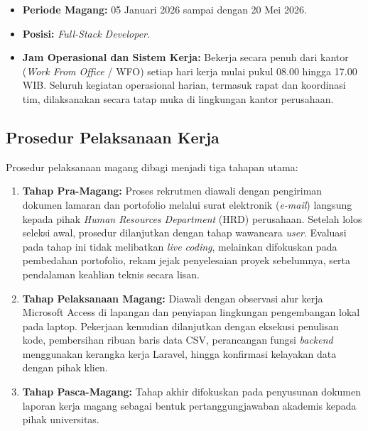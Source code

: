 \begin{itemize}
    \item \textbf{Periode Magang:} 05 Januari 2026 sampai dengan 20 Mei 2026.
    \item \textbf{Posisi:} \textit{Full-Stack Developer}.
    \item \textbf{Jam Operasional dan Sistem Kerja:} Bekerja secara penuh dari
    kantor (\textit{Work From Office} / WFO) setiap hari kerja mulai pukul
    08.00 hingga 17.00 WIB. Seluruh kegiatan operasional harian, termasuk
    rapat dan koordinasi tim, dilaksanakan secara tatap muka di lingkungan
    kantor perusahaan.
\end{itemize}
 
\subsection{Prosedur Pelaksanaan Kerja}
 
\medskip
 
Prosedur pelaksanaan magang dibagi menjadi tiga tahapan utama:
 
\vspace{0.5em}
 
\begin{enumerate}
    \item \textbf{Tahap Pra-Magang:} Proses rekrutmen diawali dengan pengiriman
    dokumen lamaran dan portofolio melalui surat elektronik (\textit{e-mail})
    langsung kepada pihak \textit{Human Resources Department} (HRD)
    perusahaan. Setelah lolos seleksi awal, prosedur dilanjutkan dengan tahap
    wawancara \textit{user}. Evaluasi pada tahap ini tidak melibatkan
    \textit{live coding}, melainkan difokuskan pada pembedahan portofolio,
    rekam jejak penyelesaian proyek sebelumnya, serta pendalaman keahlian
    teknis secara lisan.
    \item \textbf{Tahap Pelaksanaan Magang:} Diawali dengan observasi alur kerja
    Microsoft Access di lapangan dan penyiapan lingkungan pengembangan lokal
    pada laptop. Pekerjaan kemudian dilanjutkan dengan eksekusi penulisan kode,
    pembersihan ribuan baris data CSV, perancangan fungsi \textit{backend}
    menggunakan kerangka kerja Laravel, hingga konfirmasi kelayakan data dengan
    pihak klien.
    \item \textbf{Tahap Pasca-Magang:} Tahap akhir difokuskan pada penyusunan
    dokumen laporan kerja magang sebagai bentuk pertanggungjawaban akademis
    kepada pihak universitas.
\end{enumerate}
